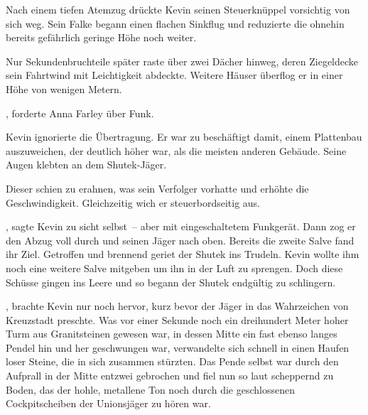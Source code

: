 \par

Nach einem tiefen Atemzug drückte Kevin seinen Steuerknüppel vorsichtig von sich weg. Sein Falke begann einen flachen Sinkflug und reduzierte die ohnehin bereits gefährlich geringe Höhe noch weiter.

\par

Nur Sekundenbruchteile später raste über zwei Dächer hinweg, deren Ziegeldecke sein Fahrtwind mit Leichtigkeit abdeckte. Weitere Häuser überflog er in einer Höhe von wenigen Metern.

\par

, forderte Anna Farley über Funk. 

\par

Kevin ignorierte die Übertragung. Er war zu beschäftigt damit, einem Plattenbau auszuweichen, der deutlich höher war, als die meisten anderen Gebäude. Seine Augen klebten an dem Shutek-Jäger.

\par

Dieser schien zu erahnen, was sein Verfolger vorhatte und erhöhte die Geschwindigkeit. Gleichzeitig wich er steuerbordseitig aus.

\par

, sagte Kevin zu sicht selbst~-- aber mit eingeschaltetem Funkgerät. Dann zog er den Abzug voll durch und seinen Jäger nach oben. Bereits die zweite Salve fand ihr Ziel. Getroffen und brennend geriet der Shutek ins Trudeln. Kevin wollte ihm noch eine weitere Salve mitgeben um ihn in der Luft zu sprengen. Doch diese Schüsse gingen ins Leere und so begann der Shutek endgültig zu schlingern.

\par

, brachte Kevin nur noch hervor, kurz bevor der Jäger in das Wahrzeichen von Kreuzstadt preschte. Was vor einer Sekunde noch ein dreihundert Meter hoher Turm aus Granitsteinen gewesen war, in dessen Mitte ein fast ebenso langes Pendel hin und her geschwungen war, verwandelte sich schnell in einen Haufen loser Steine, die in sich zusammen stürzten. Das Pende selbst war durch den Aufprall in der Mitte entzwei gebrochen und fiel nun so laut scheppernd zu Boden, das der hohle, metallene Ton noch durch die geschlossenen Cockpitscheiben der Unionsjäger zu hören war.

